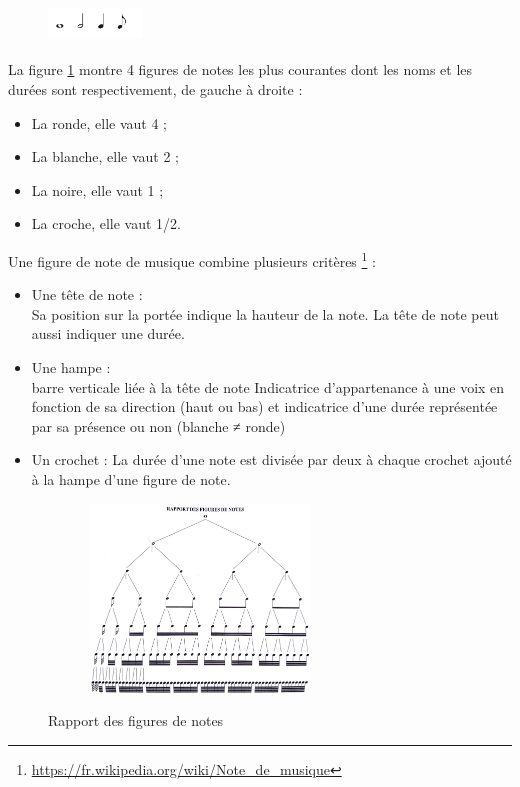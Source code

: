 \begin{figure}[h]
	\centering
	\includegraphics[height=10mm, width=25mm]{
    z_images/3_methodes/0_notation_de_la_batterie/0_figures_de_notes.png}
    \caption{}
    \label{4_notes}
\end{figure}
La figure \ref{4_notes} montre 4 figures de notes les plus courantes dont les
noms et les durées 
sont respectivement, de gauche à droite :
\begin{itemize}
    \item La ronde, elle vaut 4 ; 
    \item La blanche, elle vaut 2 ;
    \item La noire, elle vaut 1 ;
    \item La croche, elle vaut 1/2.
\end{itemize}
Une figure de note \cite{danhauser} de musique combine plusieurs critères
\footnote{\url{https://fr.wikipedia.org/wiki/Note_de_musique}} :
\begin{itemize}
	\item Une tête de note :\\
	Sa position sur la portée indique la hauteur de la note. La tête de note
    peut aussi indiquer une durée.
	\item Une hampe :\\
	barre verticale liée à la tête de note
	Indicatrice d’appartenance à une voix en fonction de sa direction (haut ou
    bas) et indicatrice d’une durée représentée par sa présence ou non (blanche
    ≠ ronde)
	\item Un crochet : La durée d’une note est divisée par deux à chaque
     crochet ajouté à la hampe d’une figure de note.
\end{itemize}
\begin{figure}[h]
	\centering
	\includegraphics[height=50mm, width=80mm]{
    z_images/3_methodes/0_notation_de_la_batterie/1_rapport_figures_notes.png}
	\caption{Rapport des figures de notes}\cite{danhauser}
	\label{rapp_fig_notes}
\end{figure}

